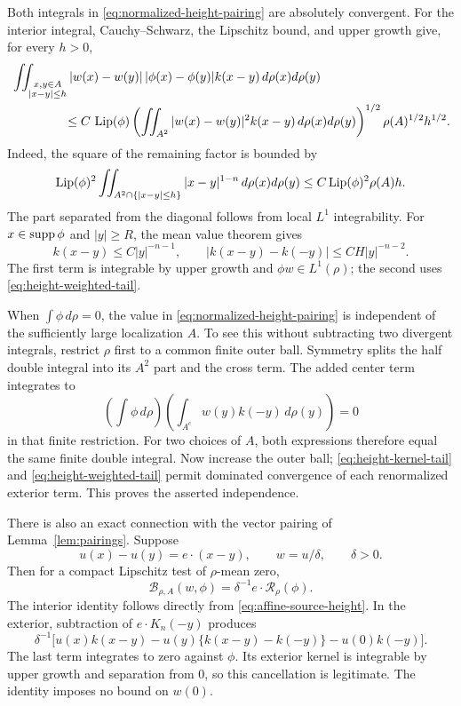 Both integrals in \eqref{eq:normalized-height-pairing} are absolutely
convergent.  For the interior integral, Cauchy--Schwarz, the Lipschitz bound,
and upper growth give, for every $h>0$,
\begin{align}
 &\iint_{\substack{x,y\in A\\|x-y|\le h}}
   |w(x)-w(y)|\,|\phi(x)-\phi(y)|k(x-y)\,d\rho(x)d\rho(y)
   \label{eq:height-diagonal-estimate}\\
 &\hspace{15mm}\le
  C\,\Lip(\phi)
  \left(\iint_{A^2}|w(x)-w(y)|^2k(x-y)\,d\rho(x)d\rho(y)\right)^{1/2}
  \rho(A)^{1/2}h^{1/2}.\notag
\end{align}
Indeed, the square of the remaining factor is bounded by
\[
 \operatorname{Lip}(\phi)^2\iint_{A^2\cap\{|x-y|\le h\}}|x-y|^{1-n}
 \,d\rho(x)d\rho(y)\le C\operatorname{Lip}(\phi)^2\rho(A)h.
\]
The part separated from the diagonal follows from local $L^1$ integrability.
For $x\in\operatorname{supp}\phi$ and $|y|\ge R$, the mean value theorem gives
\begin{equation}\label{eq:height-kernel-tail}
 k(x-y)\le C|y|^{-n-1},\qquad
 |k(x-y)-k(-y)|\le C H|y|^{-n-2}.
\end{equation}
The first term is integrable by upper growth and
$\phi w\in L^1(\rho)$; the second uses
\eqref{eq:height-weighted-tail}.

When $\int\phi\,d\rho=0$, the value in
\eqref{eq:normalized-height-pairing} is independent of the sufficiently
large localization $A$.  To see this without subtracting two divergent
integrals, restrict $\rho$ first to a common finite outer ball.  Symmetry
splits the half double integral into its $A^2$ part and the cross term.
The added center term integrates to
\[
 \left(\int\phi\,d\rho\right)
 \left(\int_{A^c}w(y)k(-y)\,d\rho(y)\right)=0
\]
in that finite restriction.  For two choices of $A$, both expressions
therefore equal the same finite double integral.  Now increase the outer
ball; \eqref{eq:height-kernel-tail} and
\eqref{eq:height-weighted-tail} permit dominated convergence of each
renormalized exterior term.  This proves the asserted independence.

There is also an exact connection with the vector pairing of
Lemma~\ref{lem:pairings}.  Suppose
\begin{equation}\label{eq:affine-source-height}
 u(x)-u(y)=e\cdot(x-y),\qquad w=u/\delta,\qquad \delta>0.
\end{equation}
Then for a compact Lipschitz test of $\rho$-mean zero,
\begin{equation}\label{eq:height-riesz-identification}
 \mathcal B_{\rho,A}(w,\phi)
       =\delta^{-1} e\cdot\mathcal R_\rho(\phi).
\end{equation}
The interior identity follows directly from
\eqref{eq:affine-source-height}.  In the exterior, subtraction of
$e\cdot K_n(-y)$ produces
\[
 \delta^{-1}\bigl[u(x)k(x-y)
       -u(y)\{k(x-y)-k(-y)\}-u(0)k(-y)\bigr].
\]
The last term integrates to zero against $\phi$.  Its exterior kernel is
integrable by upper growth and separation from $0$, so this cancellation is
legitimate.  The identity imposes no bound on $w(0)$.

